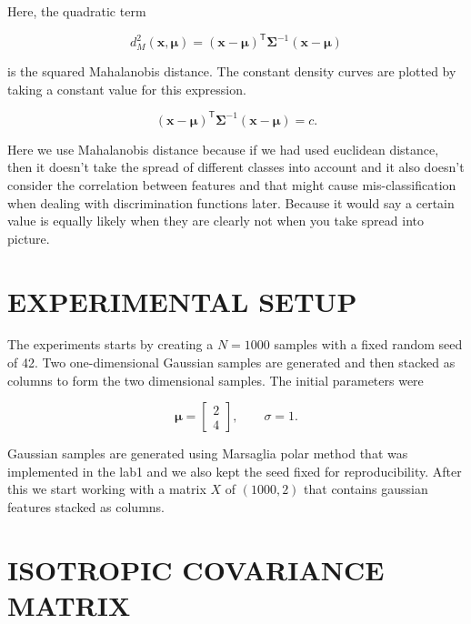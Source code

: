 \documentclass[12pt]{article}
\begin{document}
Here, the quadratic term

\begin{equation}
  d_M^2(\mathbf{x},\boldsymbol{\mu}) =
  (\mathbf{x}-\boldsymbol{\mu})^{\mathsf T}
  \boldsymbol{\Sigma}^{-1}
  (\mathbf{x}-\boldsymbol{\mu})
  \label{eq:mahalanobis}
\end{equation}

is the squared Mahalanobis distance. The constant density curves are plotted by taking a constant value for this expression.

\begin{equation}
  (\mathbf{x}-\boldsymbol{\mu})^{\mathsf T}
  \boldsymbol{\Sigma}^{-1}
  (\mathbf{x}-\boldsymbol{\mu}) = c.
  \label{eq:constant-density}
\end{equation}

Here we use Mahalanobis distance because if we had used euclidean distance, then it doesn't take the spread of different classes into account and it also doesn't consider the correlation between features and that might cause mis-classification when dealing with discrimination functions later. Because it would say a certain value is equally likely when they are clearly not when you take spread into picture.

\section*{EXPERIMENTAL SETUP}

The experiments starts by creating a $N=1000$ samples with a fixed random seed of 42. Two one-dimensional Gaussian samples are generated and then stacked as columns
to form the two dimensional samples. The initial parameters were

\begin{equation}
  \boldsymbol{\mu}=
  \begin{bmatrix}2\\4\end{bmatrix},
  \qquad \sigma=1.
\end{equation}

Gaussian samples are generated using Marsaglia polar method that was implemented in the lab1 and we also kept the seed fixed for reproducibility. After this we start working with a matrix $X$ of $(1000, 2)$ that contains gaussian features stacked as columns.

\section*{ISOTROPIC COVARIANCE MATRIX}
\end{document}
